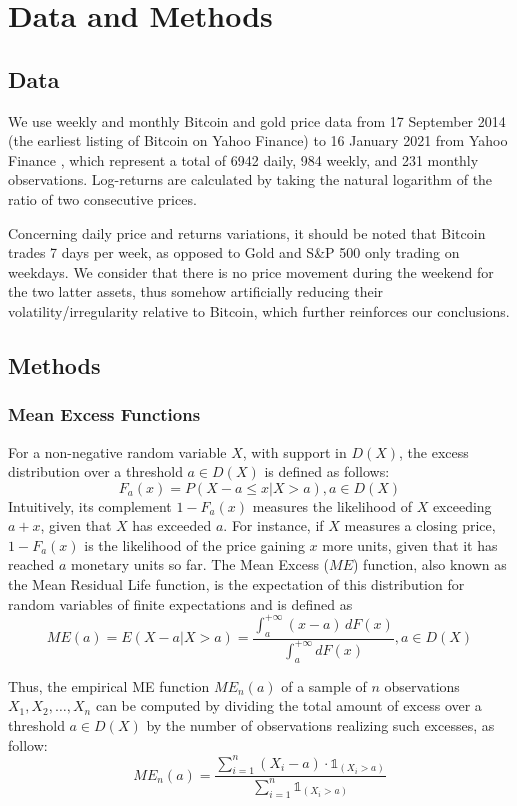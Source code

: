 \documentclass[12pt]{article}
\begin{document}
\section{Data and Methods}
\label{datamethods}
\subsection{Data}


We use weekly and monthly Bitcoin and gold price data from 17 September 2014 (the earliest listing of Bitcoin on Yahoo Finance) to 16 January 2021 from Yahoo Finance \cite{yahoobtc, yahoogold, yahoogspc}, which represent a total of 6942 daily, 984 weekly, and 231 monthly observations. Log-returns are calculated by taking the natural logarithm of the ratio of two consecutive prices.

Concerning daily price and returns variations, it should be noted that Bitcoin trades 7 days per week, as opposed to Gold and S\&P 500 only trading on weekdays. We consider that there is no price movement during the weekend for the two latter assets, thus somehow artificially reducing their volatility/irregularity relative to Bitcoin, which further reinforces our conclusions. 




\subsection{Methods}

\subsubsection{Mean Excess Functions}
For a non-negative random variable $X$, with support in $D(X)$, the excess distribution  over a threshold $a \in D(X)$ is defined \cite{mef1, mef2, mef3} as follows: $$F_a(x)=P(X-a \leq x | X>a), a \in D(X)$$ Intuitively, its complement $1-F_a(x)$ measures the likelihood of $X$ exceeding $a+x$, given that $X$ has exceeded $a$. For instance, if $X$ measures a closing price, $1-F_a(x)$ is the likelihood of the price gaining $x$ more units, given that it has reached $a$ monetary units so far. The Mean Excess ($ME$) function, also known as the Mean Residual Life function, is the expectation of this distribution for random variables of finite expectations and is defined as $$ME(a)=E(X-a|X>a)= \frac{\int_{a}^{+\infty}(x-a) \,dF(x)}{\int_{a}^{+\infty}dF(x)}, a \in D(X)$$ 

Thus, the empirical ME function $ME_n(a)$ of a sample of $n$ observations $X_1, X_2, \dots, X_n$ can be computed by dividing the total amount of excess over a threshold $a \in D(X)$ by the number of observations realizing such excesses, as follow:
$$ME_n(a)=\frac{\sum\limits_{i=1}^{n}(X_i-a)\cdot \mathds{1}_{(X_i>a)}}{\sum
\limits_{i=1}^{n} \mathds{1}_{(X_i>a)}}$$
\end{document}
